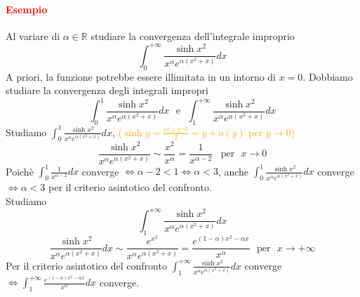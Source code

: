 \documentclass{article}
\newcommand{\R}{\mathbb{R}}
\begin{document}
\paragraph{\textcolor{red}{Esempio}}
Al variare di $\alpha \in \R $ studiare la convergenza dell'integrale improprio
\begin{equation*}
    \int_{0}^{+\infty} \frac{\sinh{x^2}}{x^\alpha e^{\alpha(x^2+x)}}dx
\end{equation*}
A priori, la funzione potrebbe essere illimitata in un intorno di $x=0$. Dobbiamo studiare la convergenza degli integrali impropri 
\begin{equation*}
     \int_{0}^{1} \frac{\sinh{x^2}}{x^\alpha e^{\alpha(x^2+x)}}dx \,\,\,\, \text{e} \,\,\,\,
      \int_{1}^{+\infty} \frac{\sinh{x^2}}{x^\alpha e^{\alpha(x^2+x)}}dx
\end{equation*}
Studiamo $\int_{0}^{1} \frac{\sinh{x^2}}{x^\alpha e^{\alpha(x^2+x)}}dx$, \textcolor{orange}{($\sinh{y}=\frac{e^y-e^{-y}}{2}=y+o(y)$ per $y \rightarrow 0$)}
\begin{equation*}
    \frac{\sinh{x^2}}{x^\alpha e^{\alpha(x^2+x)}} \sim \frac{x^2}{x^\alpha} = \frac{1}{x^{\alpha-2}} \,\,\,\,\, \text{per}\,\,\,\, x \rightarrow 0
\end{equation*}
Poichè $\int_{0}^{1} \frac{1}{x^{\alpha-2}} dx$ converge $\Leftrightarrow \alpha -2 < 1 \Leftrightarrow \alpha < 3$, anche $\int_{0}^{1} \frac{\sinh{x^2}}{x^\alpha e^{\alpha(x^2+x)}}dx$ converge $\Leftrightarrow \alpha < 3$ per il criterio asintotico del confronto.\\
Studiamo 
\begin{equation*}
    \int_{1}^{+\infty} \frac{\sinh{x^2}}{x^\alpha e^{\alpha(x^2+x)}}dx
\end{equation*}
\begin{equation*}
    \frac{\sinh{x^2}}{x^\alpha e^{\alpha(x^2+x)}}dx \sim \frac{e^{x^2}}{x^\alpha e^{\alpha(x^2+x)}}= \frac{e^{(1-\alpha)x^2-\alpha x}}{x^\alpha} \,\,\,\, \text{per} \,\,\,\, x \rightarrow +\infty
\end{equation*}
Per il criterio asintotico del confronto $\int_{1}^{+\infty} \frac{\sinh{x^2}}{x^\alpha e^{\alpha(x^2+x)}}dx$ converge $\Leftrightarrow \int_{1}^{+\infty}  \frac{e^{(1-\alpha)x^2-\alpha x}}{x^\alpha}dx$ converge.
\end{document}
